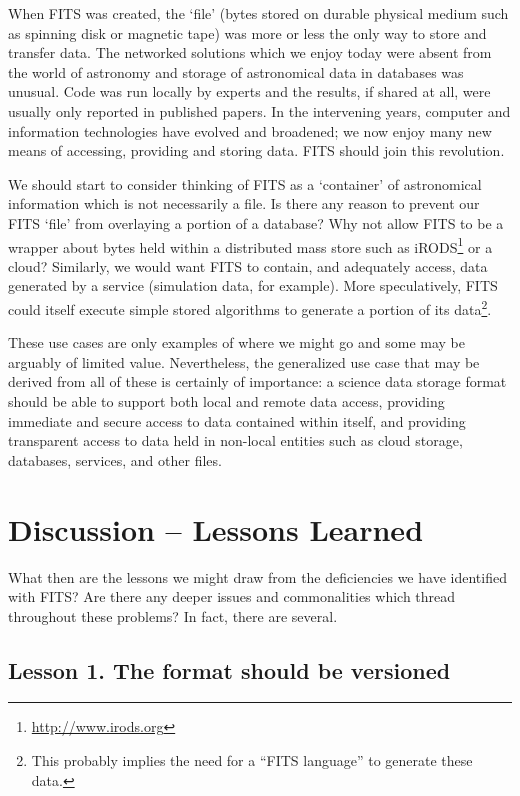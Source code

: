 \documentclass[final,authoryear,5p,times,twocolumn]{elsarticle}
\begin{document}
{{When FITS was created, the `file' (bytes stored on durable physical
medium such as spinning disk or magnetic tape) was more or less the
only way to store and transfer data. The networked solutions which we
enjoy today were absent from the world of astronomy and storage of
astronomical data in databases was unusual. Code was run locally by
experts and the results, if shared at all, were usually only reported
in published papers. In the intervening years, computer and
information technologies have evolved and broadened; we now enjoy many
new means of accessing, providing and storing data. FITS should join
this revolution.


We should start to consider thinking of FITS as a `container' of
astronomical information which is not necessarily a file. Is there
any reason to prevent our FITS `file' from overlaying a portion of a
database? Why not allow FITS to be a wrapper about bytes held within a
distributed mass store such as
iRODS\footnote{\url{http://www.irods.org}} \citep[see e.g.,][]{2007AGUFMIN13B1214R}
or a cloud?  Similarly, we would
want FITS to contain, and adequately access, data generated by a
service (simulation data, for example). More speculatively, FITS could
itself execute simple stored algorithms to generate a portion of its
data\footnote{This probably implies the need for a ``FITS language''
to generate these data.}.


These use cases are only examples of where we might go and some may be
arguably of limited value. Nevertheless, the generalized use case that
may be derived from all of these is certainly of importance:
a science data storage format should be able to support both local
and remote data access, providing immediate and secure access to data
contained within itself, and providing transparent access to data held
in non-local entities such as cloud storage, databases, services, and
other files.


\section{Discussion -- Lessons Learned}

What then are the lessons we might draw from the deficiencies
we have identified with FITS? Are there any deeper issues and
commonalities which thread throughout these problems? In fact,
there are several.


\subsection{Lesson 1. The format should be versioned}

}}
\end{document}
